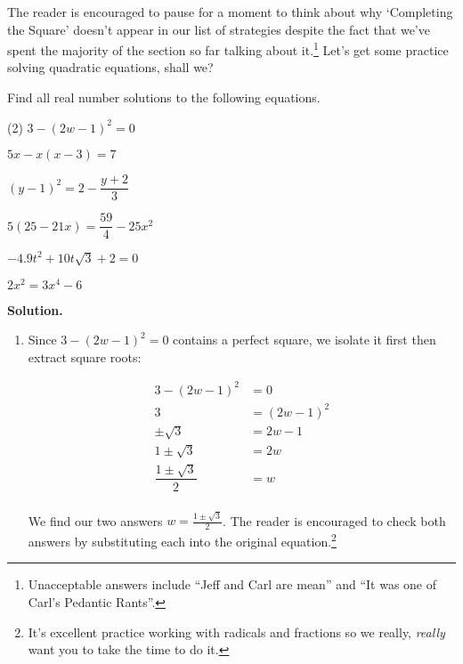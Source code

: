 The reader is encouraged to pause for a moment to think about why `Completing the Square' doesn't appear in our list of strategies despite the fact that we've spent the majority of the section so far talking about it.\footnote{Unacceptable answers include ``Jeff and Carl are mean'' and ``It was one of Carl's Pedantic Rants''.}  Let's get some practice solving quadratic equations, shall we?

\begin{ex}\label{reviewquadraticex}  Find all real number solutions to the following equations.

\begin{tasks}(2)
\task $3 - (2w-1)^2 = 0$

\task $5x - x(x-3) = 7$

\task  $(y-1)^2 = 2 - \dfrac{y+2}{3}$ 

\task $5(25 - 21x) = \dfrac{59}{4} - 25x^2$

\task $-4.9t^2 + 10t\sqrt{3} + 2 = 0$ 

\task $2x^2 = 3x^4 - 6$

\end{tasks}

{\bf Solution.}

\begin{enumerate}

\item  Since $3 - (2w-1)^2 = 0$ contains a perfect square, we isolate it first then extract square roots:

\begin{align*}
3 - (2w-1)^2 & = 0 \\
3 & = (2w-1)^2 \tag{Add $(2w-1)^2$} \\
\pm \sqrt{3} & = 2w - 1 \tag{Extract Square Roots} \\
1 \pm \sqrt{3} & = 2w \tag{Add $1$} \\
\dfrac{1 \pm \sqrt{3}}{2} & = w \tag{Divide by $2$} \\
\end{align*}

We find our two answers $w = \frac{1 \pm \sqrt{3}}{2}$.  The reader is encouraged to check both answers by substituting each into the original equation.\footnote{It's excellent  practice working with radicals and fractions so we really, \emph{really} want you to take the time to do it.}


\end{enumerate}
\end{ex}
